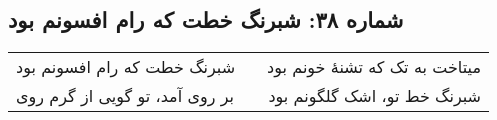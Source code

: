 \begin{center}
\section*{شماره ۳۸: شبرنگ خطت که رام افسونم بود}
\label{sec:038}
\begin{longtable}{l p{0.5cm} r}
شبرنگ خطت که رام افسونم بود
&&
میتاخت به تک که تشنهٔ خونم بود
\\
بر روی آمد، تو گویی از گرم روی
&&
شبرنگ خط تو، اشک گلگونم بود
\\
\end{longtable}
\end{center}
